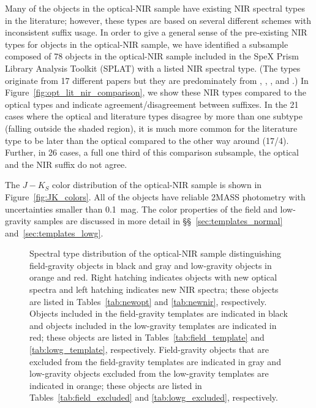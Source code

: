 \documentclass[modern]{aastex61}
\begin{document}
Many of the objects in the optical-NIR sample have existing NIR spectral types in the literature; however, these types are based on several different schemes with inconsistent suffix usage.
In order to give a general sense of the pre-existing NIR types for objects in the optical-NIR sample, we have identified a subsample composed of 78 objects in the optical-NIR sample included in the SpeX Prism Library Analysis Toolkit (SPLAT) with a listed NIR spectral type.
(The types originate from 17 different papers but they are predominately from \citet{Knapp04}, \citet{Allers:2010cg}, \citet{Kirkpatrick10}, and \citet{Gagne:2015dc}.)
In Figure~\ref{fig:opt_lit_nir_comparison}, we show these NIR types compared to the optical types and indicate agreement/disagreement between suffixes.
In the 21 cases where the optical and literature types disagree by more than one subtype (falling outside the shaded region), it is much more common for the literature type to be later than the optical compared to the other way around (17/4).
Further, in 26 cases, a full one third of this comparison subsample, the optical and the NIR suffix do not agree.


The $J-K_S$ color distribution of the optical-NIR sample is shown in Figure~\ref{fig:JK_colors}.
All of the objects have reliable 2MASS photometry with uncertainties smaller than 0.1~mag.
The color properties of the field and low-gravity samples are discussed in more detail in \S\S~\ref{sec:templates_normal} and~\ref{sec:templates_lowg}.

\begin{figure}
    \caption{Spectral type distribution of the optical-NIR sample distinguishing field-gravity objects in black and gray and low-gravity objects in orange and red.
    Right hatching indicates objects with new optical spectra and left hatching indicates new NIR spectra; these objects are listed in Tables~\ref{tab:newopt} and \ref{tab:newnir}, respectively.
    Objects included in the field-gravity templates are indicated in black and objects included in the low-gravity templates are indicated in red; these objects are listed in Tables~\ref{tab:field_template} and \ref{tab:lowg_template}, respectively.
    Field-gravity objects that are excluded from the field-gravity templates are indicated in gray and low-gravity objects excluded from the low-gravity templates are indicated in orange; these objects are listed in Tables~\ref{tab:field_excluded} and \ref{tab:lowg_excluded}, respectively.}
  \label{fig:spthist}
\end{figure}
\end{document}
